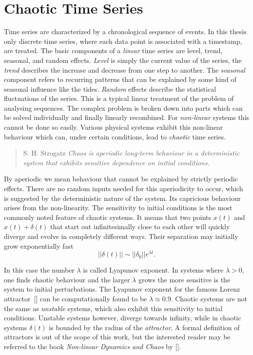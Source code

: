\newpage
\section{Chaotic Time Series}%
\label{sec:chaotic_time_series}

Time series are characterized by a chronological sequence of events.  In this
thesis only discrete time series, where each data point is associated with a
timestamp, are treated.  The basic components of a \emph{linear} time series are
level, trend, seasonal, and random effects. \emph{Level} is simply the current
value of the series, the \emph{trend} describes the increase and decrease from
one step to another. The \emph{seasonal} component refers to recurring patterns
that can be explained by some kind of seasonal influence like the tides.
\emph{Random} effects describe the statistical fluctuations of the series.
This is a typical linear treatment of the problem of analysing sequences.  The
complex problem is broken down into parts which can be solved individually and
finally linearly recombined.  For {\em non-linear} systems this cannot be done
so easily.  Various physical systems exhibit this non-linear behaviour which
can, under certain conditions, lead to \emph{chaotic} time series.
\begin{quote}{S. H. Strogatz}
  \emph{Chaos is aperiodic long-term behaviour in a deterministic system that
  exhibits sensitive dependence on initial conditions.}
\end{quote}
By aperiodic we mean behaviour that cannot be explained by strictly periodic
effects. There are no random inputs needed for this aperiodicity to occur,
which is suggested by the deterministic nature of the system. Its capricious
behaviour arises from the non-linearity.  The sensitivity to initial conditions
is the most commonly noted feature of chaotic systems.  It means that two
points $x(t)$ and $x(t)+\delta(t)$ that start out infinitesimally close to each
other will quickly diverge and evolve in completely different ways.  Their
separation may initially grow exponentially fast
\begin{equation}
  ||\delta(t)|| \sim ||\delta_0|| e^{\lambda t}.
\end{equation}

In this case the number $\lambda$ is called Lyapunov exponent. In systems where
$\lambda > 0$, one finds chaotic behaviour and the larger $\lambda$ grows the
more sensitive is the system to initial perturbations. The Lyapunov exponent
for the famous Lorenz attractor~[\cite{lorenz1963deterministic}] can be
computationally found to be $\lambda \approx 0.9$.  Chaotic systems are not the
same as \emph{unstable} systems, which also exhibit this sensitivity to initial
conditions. Unstable systems however, diverge towards infinity, while in
chaotic systems $\delta(t)$ is bounded by the radius of the \emph{attractor}.
A formal definition of attractors is out of the scope of this work, but the
interested reader may be referred to the book \emph{Non-linear Dynamics and
Chaos} by [\cite{strogatz}].



